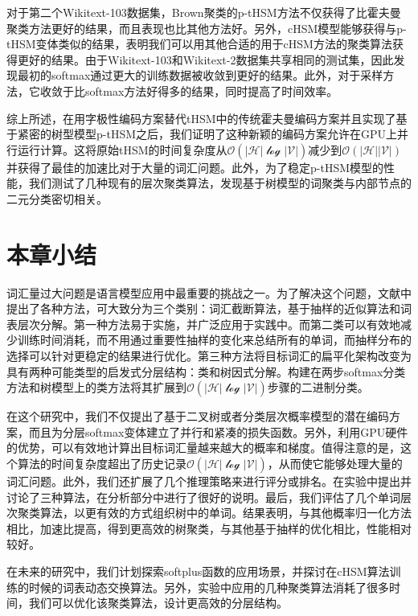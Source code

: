 对于第二个Wikitext-103数据集，Brown聚类的p-tHSM方法不仅获得了比霍夫曼聚类方法更好的结果，而且表现也比其他方法好。另外，cHSM模型能够获得与p-tHSM变体类似的结果，表明我们可以用其他合适的用于cHSM方法的聚类算法获得更好的结果。由于Wikitext-103和Wikitext-2数据集共享相同的测试集，因此发现最初的softmax通过更大的训练数据被收敛到更好的结果。此外，对于采样方法，它收敛于比softmax方法好得多的结果，同时提高了时间效率。

综上所述，在用字极性编码方案替代tHSM中的传统霍夫曼编码方案并且实现了基于紧密的树型模型p-tHSM之后，我们证明了这种新颖的编码方案允许在GPU上并行运行计算。这将原始tHSM的时间复杂度从$ \mathcal {O(| H | \log | V |)} $减少到$\mathcal{O(| H || V |)} $并获得了最佳的加速比对于大量的词汇问题。此外，为了稳定p-tHSM模型的性能，我们测试了几种现有的层次聚类算法，发现基于树模型的词聚类与内部节点的二元分类密切相关。

\section{本章小结}

词汇量过大问题是语言模型应用中最重要的挑战之一。为了解决这个问题，文献中提出了各种方法，可大致分为三个类别：词汇截断算法，基于抽样的近似算法和词表层次分解。第一种方法易于实施，并广泛应用于实践中。而第二类可以有效地减少训练时间消耗，而不用通过重要性抽样的变化来总结所有的单词，而抽样分布的选择可以针对更稳定的结果进行优化。第三种方法将目标词汇的扁平化架构改变为具有两种可能类型的启发式分层结构：类和树因式分解。构建在两步softmax分类方法和树模型上的类方法将其扩展到$\mathcal {O(| H | \log | V |)} $步骤的二进制分类。

在这个研究中，我们不仅提出了基于二叉树或者分类层次概率模型的潜在编码方案，而且为分层softmax变体建立了并行和紧凑的损失函数。另外，利用GPU硬件的优势，可以有效地计算出目标词汇量越来越大的概率和梯度。值得注意的是，这个算法的时间复杂度超出了历史记录$ \mathcal {O(| H | \log | V |)}$，从而使它能够处理大量的词汇问题。此外，我们还扩展了几个推理策略来进行评分或排名。在实验中提出并讨论了三种算法，在分析部分中进行了很好的说明。最后，我们评估了几个单词层次聚类算法，以更有效的方式组织树中的单词。结果表明，与其他概率归一化方法相比，加速比提高，得到更高效的树聚类，与其他基于抽样的优化相比，性能相对较好。

在未来的研究中，我们计划探索softplus函数的应用场景，并探讨在cHSM算法训练的时候的词表动态交换算法。另外，实验中应用的几种聚类算法消耗了很多时间，我们可以优化该聚类算法，设计更高效的分层结构。
